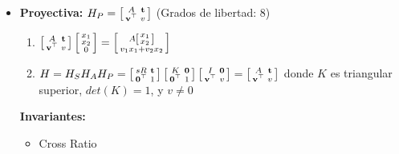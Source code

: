 \documentclass[12pt,a4paper]{article}
\begin{document}
\begin{itemize}
\item {\bf Proyectiva:}
$H_{P} =
\left[ {\begin{smallmatrix}
 A & {\bf t}\\
 {\bf v}^{\top} & v \\
\end{smallmatrix} } \right]
$ \hspace*{1cm}(Grados de libertad: 8)

	\begin{enumerate}
		\item $\left[ {\begin{smallmatrix}
		  A & {\bf t}\\
		 {\bf v}^{\top} & v \\
		\end{smallmatrix} } \right] \left[ {\begin{smallmatrix}
		 x_{1}\\
		 x_{2}\\
		 0\\
		\end{smallmatrix} } \right] = \left[ {\begin{smallmatrix}
		 A\left[ {\begin{smallmatrix}
		  x_{1}\\
		   x_{2}\\
		 \end{smallmatrix} } \right]\\
		 v_{1}x_{1}+v_{2}x_{2}\\
		\end{smallmatrix} } \right]
		$

		\item $H = H_{S}H_{A}H_{P} = \left[ {\begin{smallmatrix}
		 sR & {\bf t}\\
		 {\bf 0}^{\top} & 1 \\
		\end{smallmatrix} } \right]\left[ {\begin{smallmatrix}
		 K & {\bf 0}\\
		 {\bf 0}^{\top} & 1 \\
		\end{smallmatrix} } \right]\left[ {\begin{smallmatrix}
		 I & {\bf 0}\\
		 {\bf v}^{\top} & v \\
		\end{smallmatrix} } \right]=\left[ {\begin{smallmatrix}
		 A & {\bf t}\\
		 {\bf v}^{\top} & v \\
		\end{smallmatrix} } \right]
		$ donde $K$ es triangular superior, $det(K)=1$, y $v \neq 0$
	\end{enumerate}
	
	{\bf Invariantes:} 
	\begin{itemize}
		\item Cross Ratio
	\end{itemize}

\end{itemize}
\end{document}
